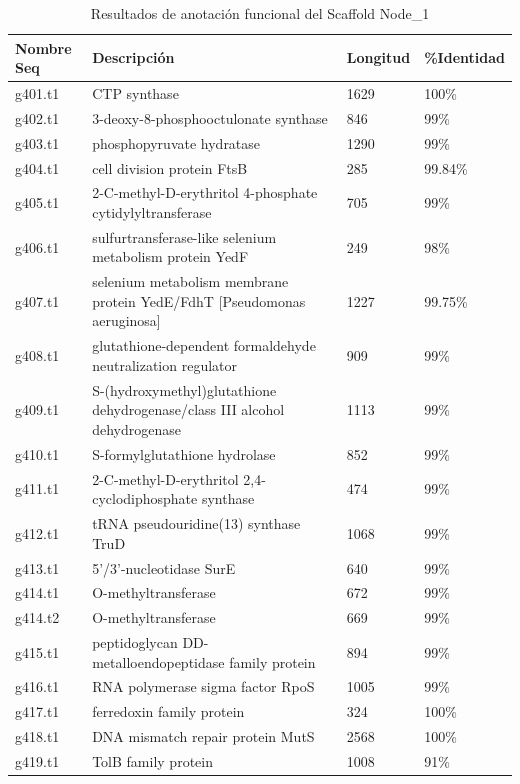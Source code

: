 \documentclass[journal, letterpaper, 11pt]{IEEEtran}
\begin{document}
\begin{table}[H]
\begin{center}
\caption{Resultados de anotación funcional del Scaffold Node\_1}
\begin{tabular}{|p{1cm}|p{3.5cm}||p{1cm}||p{1cm}|} 
\hline
Nombre Seq & Descripción & Longitud & \%Identidad \\ \hline
g401.t1 & CTP synthase & 1629 & 100\% \\ \hline
g402.t1 & 3-deoxy-8-phosphooctulonate synthase & 846 & 99\% \\ \hline
g403.t1 & phosphopyruvate hydratase & 1290 & 99\% \\ \hline
g404.t1 & cell division protein FtsB & 285 & 99.84\%  \\ \hline
g405.t1 & 2-C-methyl-D-erythritol 4-phosphate cytidylyltransferase  & 705 & 99\%  \\ \hline
g406.t1 & sulfurtransferase-like selenium metabolism protein YedF & 249 & 98\%  \\ \hline
g407.t1 & selenium metabolism membrane protein YedE/FdhT [Pseudomonas aeruginosa] & 1227 & 99.75\%  \\ \hline
g408.t1 & glutathione-dependent formaldehyde neutralization regulator & 909 & 99\%  \\ \hline
g409.t1 & S-(hydroxymethyl)glutathione dehydrogenase/class III alcohol dehydrogenase & 1113 & 99\%  \\ \hline
g410.t1 & S-formylglutathione hydrolase & 852 & 99\%  \\ \hline
g411.t1 & 2-C-methyl-D-erythritol 2,4-cyclodiphosphate synthase & 474 & 99\%  \\ \hline
g412.t1 & tRNA pseudouridine(13) synthase TruD & 1068 & 99\%  \\ \hline
g413.t1 & 5'/3'-nucleotidase SurE & 640 & 99\% \\ \hline
g414.t1 & O-methyltransferase & 672 & 99\% \\ \hline
g414.t2 & O-methyltransferase & 669 & 99\% \\ \hline
g415.t1 & peptidoglycan DD-metalloendopeptidase family protein  & 894 & 99\% \\ \hline
g416.t1 & RNA polymerase sigma factor RpoS & 1005 & 99\% \\ \hline
g417.t1 & ferredoxin family protein & 324 & 100\% \\ \hline
g418.t1 & DNA mismatch repair protein MutS & 2568 & 100\% \\ \hline
g419.t1 & TolB family protein  & 1008 & 91\% \\ \hline

\end{tabular}
\end{center}
\end{table}
\end{document}
